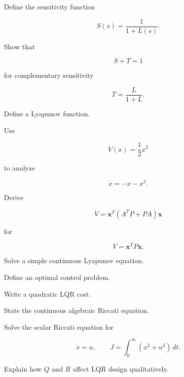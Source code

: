 \begin{exercise}[2]
Define the sensitivity function

\[
S(s)=\frac{1}{1+L(s)}.
\]
\end{exercise}

\begin{exercise}[3]
Show that

\[
S+T=1
\]

for complementary sensitivity

\[
T=\frac{L}{1+L}.
\]
\end{exercise}

\begin{exercise}[2]
Define a Lyapunov function.
\end{exercise}

\begin{exercise}[3]
Use

\[
V(x)=\frac12x^2
\]

to analyze

\[
\dot{x}=-x-x^3.
\]
\end{exercise}

\begin{exercise}[3]
Derive

\[
\dot V
=
\mathbf{x}^T
(A^TP+PA)
\mathbf{x}
\]

for

\[
V=\mathbf{x}^TP\mathbf{x}.
\]
\end{exercise}

\begin{exercise}[3]
Solve a simple continuous Lyapunov equation.
\end{exercise}

\begin{exercise}[2]
Define an optimal control problem.
\end{exercise}

\begin{exercise}[2]
Write a quadratic LQR cost.
\end{exercise}

\begin{exercise}[2]
State the continuous algebraic Riccati equation.
\end{exercise}

\begin{exercise}[3]
Solve the scalar Riccati equation for

\[
\dot{x}=u,
\qquad
J=\int_0^\infty(x^2+u^2)\,dt.
\]
\end{exercise}

\begin{exercise}[3]
Explain how \(Q\) and \(R\) affect LQR design qualitatively.
\end{exercise}


